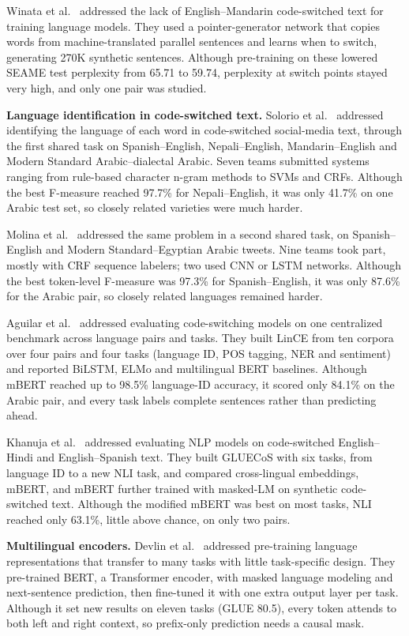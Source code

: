 \documentclass[sigconf]{acmart}
\begin{document}
Winata et al.~\cite{winata2019synthetic} addressed the lack of English--Mandarin code-switched text for training
language models. They used a pointer-generator network that copies words from machine-translated parallel sentences
and learns when to switch, generating 270K synthetic sentences. Although pre-training on these lowered SEAME test
perplexity from 65.71 to 59.74, perplexity at switch points stayed very high, and only one pair was studied.

\textbf{Language identification in code-switched text.} Solorio et al.~\cite{solorio2014overview} addressed identifying
the language of each word in code-switched social-media text, through the first shared task on Spanish--English,
Nepali--English, Mandarin--English and Modern Standard Arabic--dialectal Arabic. Seven teams submitted systems
ranging from rule-based character n-gram methods to SVMs and CRFs. Although the best F-measure reached 97.7\% for
Nepali--English, it was only 41.7\% on one Arabic test set, so closely related varieties were much harder.

Molina et al.~\cite{molina2016overview} addressed the same problem in a second shared task, on Spanish--English and
Modern Standard--Egyptian Arabic tweets. Nine teams took part, mostly with CRF sequence labelers; two used CNN or LSTM
networks. Although the best token-level F-measure was 97.3\% for Spanish--English, it was only 87.6\% for the Arabic
pair, so closely related languages remained harder.

Aguilar et al.~\cite{aguilar2020lince} addressed evaluating code-switching models on one centralized benchmark across
language pairs and tasks. They built LinCE from ten corpora over four pairs and four tasks (language ID, POS tagging,
NER and sentiment) and reported BiLSTM, ELMo and multilingual BERT baselines. Although mBERT reached up to 98.5\%
language-ID accuracy, it scored only 84.1\% on the Arabic pair, and every task labels complete sentences rather than
predicting ahead.

Khanuja et al.~\cite{khanuja2020gluecos} addressed evaluating NLP models on code-switched English--Hindi and
English--Spanish text. They built GLUECoS with six tasks, from language ID to a new NLI task, and compared
cross-lingual embeddings, mBERT, and mBERT further trained with masked-LM on synthetic code-switched text. Although
the modified mBERT was best on most tasks, NLI reached only 63.1\%, little above chance, on only two pairs.

\textbf{Multilingual encoders.} Devlin et al.~\cite{devlin2019bert} addressed pre-training language representations
that transfer to many tasks with little task-specific design. They pre-trained BERT, a Transformer encoder, with
masked language modeling and next-sentence prediction, then fine-tuned it with one extra output layer per task.
Although it set new results on eleven tasks (GLUE 80.5), every token attends to both left and right context, so
prefix-only prediction needs a causal mask.
\end{document}
